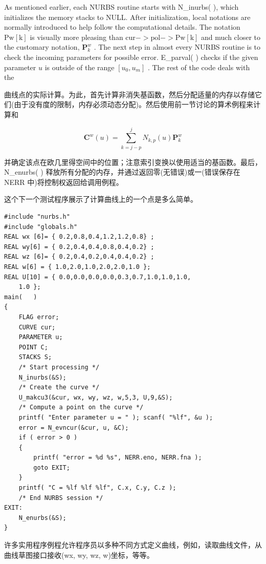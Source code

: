 \documentclass[../main.tex]{subfiles}
\begin{document}
As mentioned earlier, each NURBS routine starts with N\_inurbs(   ), which initializes the memory stacks to NULL. After initialization, local notations are normally introduced to help follow the computational details. The notation \(\mathrm{{Pw}}\left\lbrack  \mathrm{k}\right\rbrack\) is visually more pleasing than \(\mathrm{{cur}} -  > \mathrm{{pol}} -  > \mathrm{{Pw}}\left\lbrack  \mathrm{k}\right\rbrack\) and much closer to the customary notation, \({\mathbf{P}}_{k}^{w}\) . The next step in almost every NURBS routine is to check the incoming parameters for possible error. E\_parval(   ) checks if the given parameter \(u\) is outside of the range \(\left\lbrack  {{u}_{0},{u}_{m}}\right\rbrack\) . The rest of the code deals with the

曲线点的实际计算。为此，首先计算非消失基函数，然后分配适量的内存以存储它们(由于没有度的限制，内存必须动态分配)。然后使用前一节讨论的算术例程来计算和

\[
{\mathbf{C}}^{w}\left( u\right)  = \mathop{\sum }\limits_{{k = j - p}}^{j}{N}_{k,p}\left( u\right) {\mathbf{P}}_{k}^{w}
\]

并确定该点在欧几里得空间中的位置；注意索引变换以使用适当的基函数。最后，N\_enurbs(   ) 释放所有分配的内存，并通过返回零(无错误)或一(错误保存在 NERR 中)将控制权返回给调用例程。

这个下一个测试程序展示了计算曲线上的一个点是多么简单。

\begin{verbatim}
#include "nurbs.h"
#include "globals.h"
REAL wx [6]= { 0.2,0.8,0.4,1.2,1.2,0.8} ;
REAL wy[6] = { 0.2,0.4,0.4,0.8,0.4,0.2} ;
REAL wz [6]= { 0.2,0.4,0.2,0.4,0.4,0.2} ;
REAL w[6] = { 1.0,2.0,1.0,2.0,2.0,1.0 };
REAL U[10] = { 0.0,0.0,0.0,0.0,0.3,0.7,1.0,1.0,1.0,
    1.0 };
main(   )
{
    FLAG error;
    CURVE cur;
    PARAMETER u;
    POINT C;
    STACKS S;
    /* Start processing */
    N_inurbs(&S);
    /* Create the curve */
    U_makcu3(&cur, wx, wy, wz, w,5,3, U,9,&S);
    /* Compute a point on the curve */
    printf( "Enter parameter u = " ); scanf( "%lf", &u );
    error = N_evncur(&cur, u, &C);
    if ( error > 0 )
    {
        printf( "error = %d %s", NERR.eno, NERR.fna );
        goto EXIT;
    }
    printf( "C = %lf %lf %lf", C.x, C.y, C.z );
    /* End NURBS session */
EXIT:
    N_enurbs(&S);
}
\end{verbatim}

许多实用程序例程允许程序员以多种不同方式定义曲线，例如，读取曲线文件，从曲线草图接口接收(wx, wy, wz, w)坐标，等等。
\end{document}
